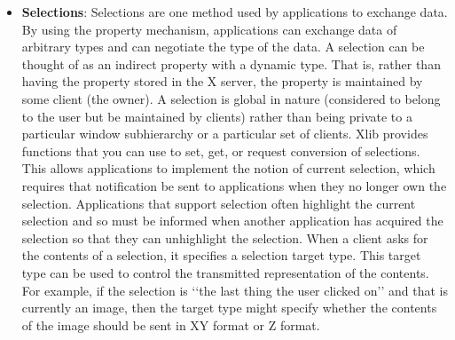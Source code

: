 \documentclass{report}
\begin{document}
\begin{itemize}
        \bigbreak \noindent 
        To delete a property on a given window, use \textbf{XDeleteProperty.}
        \bigbreak \noindent 
        \begin{cppcode}
            XDeleteProperty (display, w, property)
        \end{cppcode}
        \bigbreak \noindent
        \begin{itemize}
            \item display Specifies the connection to the X server.
            \item $w$ Specifies the window whose property you want to delete.
            \item property Specifies the property name.
        \end{itemize}
        The \textbf{XDeleteProperty} function deletes the specified property only if the property was defined on the specified window and causes the X server to generate a \textbf{PropertyNotify} event on the window unless the property does not exist.
        \bigbreak \noindent 
        \textbf{XDeleteProperty} can generate \textbf{BadAtom} and \textbf{BadWindow} errors.
    \item \textbf{Selections}: Selections are one method used by applications to exchange data. By using the property mechanism, applications can exchange data of arbitrary types and can negotiate the type of the data. A selection can be thought of as an indirect property with a dynamic type. That is, rather than having the property stored in the X server, the property is maintained by some client (the owner). A selection is global in nature (considered to belong to the user but be maintained by clients) rather than being private to a particular window subhierarchy or a particular set of clients. Xlib provides functions that you can use to set, get, or request conversion of selections. This allows applications to implement the notion of current selection, which requires that notification
        be sent to applications when they no longer own the selection. Applications that support selection often highlight the current selection and so must be informed when another application has acquired the selection so that they can unhighlight the selection.
        \bigbreak \noindent 
        When a client asks for the contents of a selection, it specifies a selection target type. This target type can be used to control the transmitted representation of the contents. For example, if the selection is ‘‘the last thing the user clicked on’’ and that is currently an image, then the target type might specify whether the contents of the image should be sent in XY format or Z format.

\end{itemize}
\end{document}
